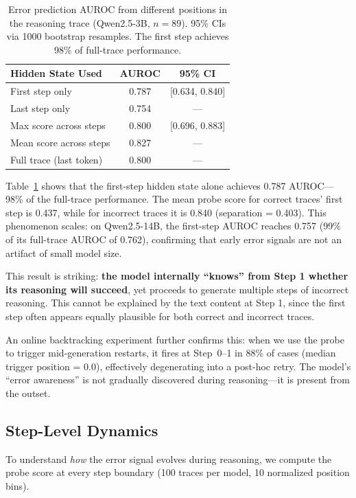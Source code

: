 \documentclass[11pt]{article}
\newcommand{\modelsmall}{Qwen2.5-3B}
\newcommand{\modellarge}{Qwen2.5-14B}
\begin{document}
\begin{table}[t]
\centering
\small
\begin{tabular}{lcc}
\toprule
\textbf{Hidden State Used} & \textbf{AUROC} & \textbf{95\% CI} \\
\midrule
First step only & 0.787 & [0.634, 0.840] \\
Last step only & 0.754 & --- \\
Max score across steps & 0.800 & [0.696, 0.883] \\
Mean score across steps & 0.827 & --- \\
Full trace (last token) & 0.800 & --- \\
\bottomrule
\end{tabular}
\caption{Error prediction AUROC from different positions in the reasoning trace (\modelsmall, $n=89$). 95\% CIs via 1000 bootstrap resamples. The first step achieves 98\% of full-trace performance.}
\label{tab:first_step}
\end{table}

Table~\ref{tab:first_step} shows that the first-step hidden state alone achieves 0.787 AUROC---98\% of the full-trace performance.
The mean probe score for correct traces' first step is 0.437, while for incorrect traces it is 0.840 (separation = 0.403).
This phenomenon scales: on \modellarge, the first-step AUROC reaches 0.757 (99\% of its full-trace AUROC of 0.762), confirming that early error signals are not an artifact of small model size.

This result is striking: \textbf{the model internally ``knows'' from Step 1 whether its reasoning will succeed}, yet proceeds to generate multiple steps of incorrect reasoning.
This cannot be explained by the text content at Step 1, since the first step often appears equally plausible for both correct and incorrect traces.

An online backtracking experiment further confirms this: when we use the probe to trigger mid-generation restarts, it fires at Step~0--1 in 88\% of cases (median trigger position = 0.0), effectively degenerating into a post-hoc retry.
The model's ``error awareness'' is not gradually discovered during reasoning---it is present from the outset.

\subsection{Step-Level Dynamics}

To understand \textit{how} the error signal evolves during reasoning, we compute the probe score at every step boundary (100 traces per model, 10 normalized position bins).
\end{document}
